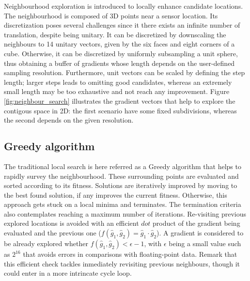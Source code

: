 Neighbourhood exploration is introduced to locally enhance candidate locations. The neighbourhood is composed of 3D points near a sensor location. Its discretization poses several challenges since it there exists an infinite number of translation, despite being unitary. It can be discretized by downscaling the neighbours to 14 unitary vectors, given by the six faces and eight corners of a cube. Otherwise, it can be discretized by uniformly subsampling a unit sphere, thus obtaining a buffer of gradients whose length depends on the user-defined sampling resolution. Furthermore, unit vectors can be scaled by defining the step length; larger steps leads to omitting good candidates, whereas an extremely small length may be too exhaustive and not reach any improvement. Figure \ref{fig:neighbour_search} illustrates the gradient vectors that help to explore the contigous space in 2D: the first scenario have some fixed subdivisions, whereas the second depends on the given resolution.


\subsection{Greedy algorithm}

The traditional local search is here referred as a Greedy algorithm that helps to rapidly survey the neighbourhood. These surrounding points are evaluated and sorted according to its fitness. Solutions are iteratively improved by moving to the best found solution, if any improves the current fitness. Otherwise, this approach gets stuck on a local minima and terminates. The termination criteria also contemplates reaching a maximum number of iterations. Re-visiting previous explored locations is avoided with an efficient $\textit{dot}$ product of the gradient being evaluated and the previous one ($f(\hat{g}_1, \hat{g}_2) = \hat{g}_1 \cdot \hat{g}_2$). A gradient is considered to be already explored whether $f(\hat{g}_1, \hat{g}_2) < \epsilon - 1$, with $\epsilon$ being a small value such as $2^16$ that avoids errors in comparisons with floating-point data. Remark that this efficient check tackles inmediately revisiting previous neighbours, though it could enter in a more intrincate cycle loop.

